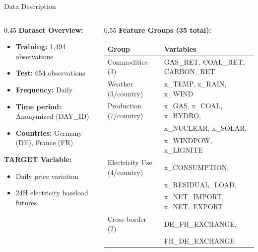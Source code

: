 \documentclass[aspectratio=169]{beamer}
\begin{document}
\begin{frame}{Data Description}
\begin{columns}
\begin{column}{0.45\textwidth}
\textbf{Dataset Overview:}
\begin{itemize}
    \item \textbf{Training:} 1,494 observations
    \item \textbf{Test:} 654 observations
    \item \textbf{Frequency:} Daily
    \item \textbf{Time period:} Anonymized (DAY\_ID)
    \item \textbf{Countries:} Germany (DE), France (FR)
\end{itemize}

\vspace{0.2cm}
\textbf{TARGET Variable:}
\begin{itemize}
    \item Daily price variation
    \item 24H electricity baseload futures
\end{itemize}
\end{column}

\begin{column}{0.55\textwidth}
\textbf{Feature Groups (35 total):}
\begin{table}
\tiny
\begin{tabular}{l|l}
\toprule
\textbf{Group} & \textbf{Variables} \\
\midrule
Commodities (3) & GAS\_RET, COAL\_RET, CARBON\_RET \\
Weather (3/country) & x\_TEMP, x\_RAIN, x\_WIND \\
Production (7/country) & x\_GAS, x\_COAL, x\_HYDRO, \\
& x\_NUCLEAR, x\_SOLAR, \\
& x\_WINDPOW, x\_LIGNITE \\
Electricity Use (4/country) & x\_CONSUMPTION, \\
& x\_RESIDUAL\_LOAD, \\
& x\_NET\_IMPORT, x\_NET\_EXPORT \\
Cross-border (2) & DE\_FR\_EXCHANGE, \\
& FR\_DE\_EXCHANGE \\
\bottomrule
\end{tabular}
\end{table}
\end{column}
\end{columns}
\end{frame}
\end{document}
